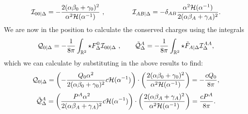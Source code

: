 \begin{equation*}
    {\cal I}_{00|\Delta} =  -\frac{2(\alpha \beta_0 + \gamma_0)^2}{\alpha^2 {\cal H}(\alpha^{-1})} \ , \qquad  \qquad {\cal I}_{AB|\Delta} = -\delta_{AB} \frac{\alpha^2 {\cal H}(\alpha^{-1})}{2(\alpha \beta_A + \gamma_A)^2}.
\end{equation*}
We are now in the position to calculate the conserved charges using the integrals
\begin{equation*}
    \mathcal{Q}_{0|\Delta} = -\frac{1}{8 \pi} \int_{\Real^2} \star F^0_\Delta \I_{00| \Delta} \ ,\qquad     \tilde{\mathcal{Q}}^A_\Delta = -\frac{1}{8 \pi} \int_{\Real^2}  \star \tilde{F}_{A|\Delta} \I^{AA}_\Delta ,
\end{equation*} 
which we can calculate by substituting in the above results to find:
\begin{equation*}
    \mathcal{Q}_{0|\Delta} =  \left(-\frac{Q_0 \alpha^2}{2 (\alpha \beta_0 + \gamma_0)^2} c {\cal H}(\alpha^{-1}) \right) \cdot \left(\frac{2(\alpha \beta_0 + \gamma_0)^2}{\alpha^2 {\cal H}(\alpha^{-1})} \right) = - \frac{c Q_0}{8 \pi},
\end{equation*}
\begin{equation*}
\tilde{\mathcal{Q}}^A_\Delta = \left(\frac{P^A \alpha^2}{2 (\alpha \beta_A + \gamma_A)^2} c {\cal H}(\alpha^{-1}) \right) \cdot \left(\frac{2(\alpha \beta_A + \gamma_A)^2}{\alpha^2 {\cal H}(\alpha^{-1})} \right) = \frac{c P^A}{8 \pi}.
\end{equation*}


